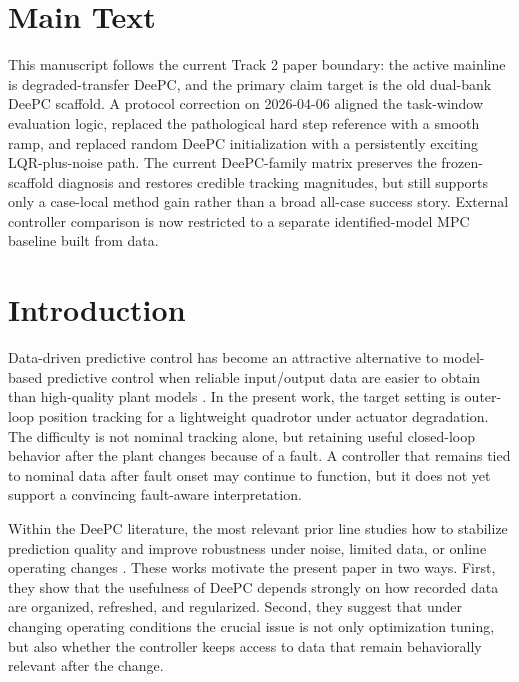 \documentclass[12pt,a4paper]{article}
\begin{document}
\newpage
\section*{Main Text}

This manuscript follows the current Track 2 paper boundary: the active mainline is degraded-transfer DeePC, and the primary claim target is the old dual-bank DeePC scaffold. A protocol correction on 2026-04-06 aligned the task-window evaluation logic, replaced the pathological hard step reference with a smooth ramp, and replaced random DeePC initialization with a persistently exciting LQR-plus-noise path. The current DeePC-family matrix preserves the frozen-scaffold diagnosis and restores credible tracking magnitudes, but still supports only a case-local method gain rather than a broad all-case success story. External controller comparison is now restricted to a separate identified-model MPC baseline built from data.

\vspace{1em}
\tableofcontents
\newpage

\section{Introduction}

Data-driven predictive control has become an attractive alternative to model-based predictive control when reliable input/output data are easier to obtain than high-quality plant models \cite{coulson2019deepc,coulson2019regularized,baros2022odeepc}. In the present work, the target setting is outer-loop position tracking for a lightweight quadrotor under actuator degradation. The difficulty is not nominal tracking alone, but retaining useful closed-loop behavior after the plant changes because of a fault. A controller that remains tied to nominal data after fault onset may continue to function, but it does not yet support a convincing fault-aware interpretation.

Within the DeePC literature, the most relevant prior line studies how to stabilize prediction quality and improve robustness under noise, limited data, or online operating changes \cite{coulson2019deepc,coulson2019regularized,baros2022odeepc}. These works motivate the present paper in two ways. First, they show that the usefulness of DeePC depends strongly on how recorded data are organized, refreshed, and regularized. Second, they suggest that under changing operating conditions the crucial issue is not only optimization tuning, but also whether the controller keeps access to data that remain behaviorally relevant after the change.
\end{document}
